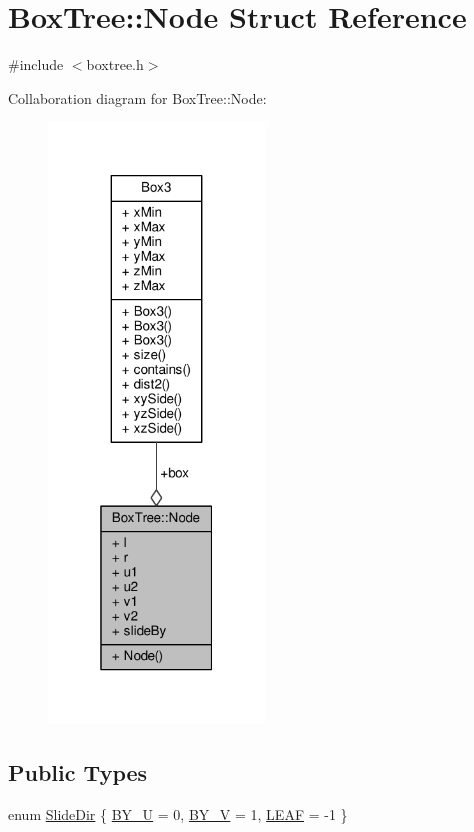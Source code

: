 \hypertarget{structBoxTree_1_1Node}{}\section{Box\+Tree\+:\+:Node Struct Reference}
\label{structBoxTree_1_1Node}


{\ttfamily \#include $<$boxtree.\+h$>$}



Collaboration diagram for Box\+Tree\+:\+:Node\+:\nopagebreak
\begin{figure}[H]
\begin{center}
\leavevmode
\includegraphics[width=163pt]{structBoxTree_1_1Node__coll__graph}
\end{center}
\end{figure}
\subsection*{Public Types}
\begin{DoxyCompactItemize}
\item 
enum \hyperlink{structBoxTree_1_1Node_af862522c79bbea75bbbfa47614842295}{Slide\+Dir} \{ \hyperlink{structBoxTree_1_1Node_af862522c79bbea75bbbfa47614842295a8de683397fda85467d10531bdaf67577}{B\+Y\+\_\+U} = 0, 
\hyperlink{structBoxTree_1_1Node_af862522c79bbea75bbbfa47614842295acd6e4816ec952840b6cd2dc8261a3963}{B\+Y\+\_\+V} = 1, 
\hyperlink{structBoxTree_1_1Node_af862522c79bbea75bbbfa47614842295a06e0ae6f4066175d8a5739b775f52c83}{L\+E\+AF} = -\/1
 \}
\end{DoxyCompactItemize}

